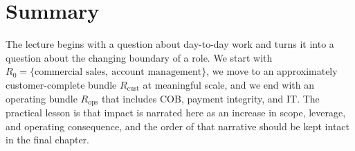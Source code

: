 \section{Summary}

The lecture begins with a question about day-to-day work and turns it into a question about the changing boundary of a role. We start with \(R_0 = \{\text{commercial sales},\ \text{account management}\}\), we move to an approximately customer-complete bundle \(R_{\mathrm{cust}}\) at meaningful scale, and we end with an operating bundle \(R_{\mathrm{ops}}\) that includes COB, payment integrity, and IT. The practical lesson is that impact is narrated here as an increase in scope, leverage, and operating consequence, and the order of that narrative should be kept intact in the final chapter.